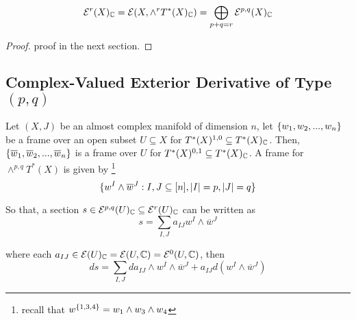 \begin{proposition}
	$$
		\E^r(X)_\C = \E\tuple*{X, \wedge^r T^*(X)_\C} = \bigoplus_{p+q=r} \E^{p, q}(X)_\C
	$$
	\begin{proof}
		proof in the next section.
	\end{proof}
\end{proposition}

 \subsection{Complex-Valued Exterior Derivative of Type $(p, q)$}

\begin{definition}
	Let $(X, J)$ be an almost complex manifold of dimension $n$, let $\{w_1, w_2, ..., w_n\}$ be a frame over an open subset $U \subseteq X$ for $T^*(X)^{1,0} \subseteq T^*(X)_{\mathbb{C}}$. Then, $\{\overline{w}_1, \overline{w}_2, ..., \overline{w}_n\}$	is a frame over $U$ for $T^*(X)^{0,1} \subseteq T^*(X)_{\mathbb{C}}$. A frame for $\wedge^{p,q} T^*(X)$ is given by \footnote{recall that $w^{\{1, 3, 4\}} = w_1 \wedge w_3 \wedge w_4$}
	$$
		\{w^I \wedge \overline{w}^J: I, J \subseteq [n], |I| = p, |J| = q\}
	$$
	
	So that, a section $s \in \mathcal{E}^{p,q}(U)_{\mathbb{C}} \subseteq \mathcal{E}^r(U)_{\mathbb{C}}$ can be written as
	$$
		s = \sum_{I, J} a_{IJ} w^I \wedge \overline{w}^J
	$$
	
	where each $a_{IJ} \in \mathcal{E}(U)_{\mathbb{C}} = \mathcal{E}(U, \mathbb{C}) = \mathcal{E}^0(U, \mathbb{C})$, then
	$$
		ds = \sum_{I, J} d a_{IJ} \wedge w^I \wedge \overline{w}^J + a_{IJ} d(w^I \wedge \overline{w}^J)
	$$

\end{definition}

